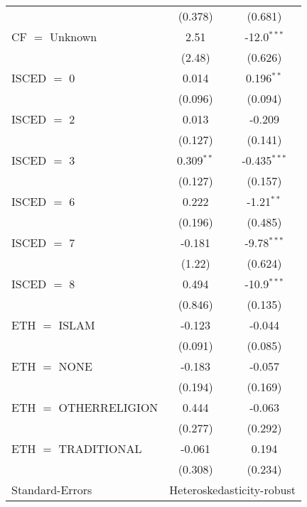 \begin{table}[htbp!]
\begin{adjustbox}{width = 1\textwidth, max height = 0.95\textheight, center}
\begin{threeparttable}[b]
\begin{tabular}{lcc}
                                  & (0.378)        & (0.681)\\   
            CF $=$ Unknown        & 2.51           & -12.0$^{***}$\\   
                                  & (2.48)         & (0.626)\\   
            ISCED $=$ 0           & 0.014          & 0.196$^{**}$\\   
                                  & (0.096)        & (0.094)\\   
            ISCED $=$ 2           & 0.013          & -0.209\\   
                                  & (0.127)        & (0.141)\\   
            ISCED $=$ 3           & 0.309$^{**}$   & -0.435$^{***}$\\   
                                  & (0.127)        & (0.157)\\   
            ISCED $=$ 6           & 0.222          & -1.21$^{**}$\\   
                                  & (0.196)        & (0.485)\\   
            ISCED $=$ 7           & -0.181         & -9.78$^{***}$\\   
                                  & (1.22)         & (0.624)\\   
            ISCED $=$ 8           & 0.494          & -10.9$^{***}$\\   
                                  & (0.846)        & (0.135)\\   
            ETH $=$ ISLAM         & -0.123         & -0.044\\   
                                  & (0.091)        & (0.085)\\   
            ETH $=$ NONE          & -0.183         & -0.057\\   
                                  & (0.194)        & (0.169)\\   
            ETH $=$ OTHERRELIGION & 0.444          & -0.063\\   
                                  & (0.277)        & (0.292)\\   
            ETH $=$ TRADITIONAL   & -0.061         & 0.194\\   
                                  & (0.308)        & (0.234)\\   
            \midrule 
            Standard-Errors & \multicolumn{2}{c}{Heteroskedasticity-robust} \\ 

\end{tabular}
\end{threeparttable}
\end{adjustbox}
\end{table}
